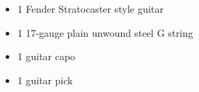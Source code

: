 \begin{itemize}
    \item 1 Fender Stratocaster style guitar
    \item 1 17-gauge plain unwound steel G string
    \item 1 guitar capo 
    \item 1 guitar pick
\end{itemize}